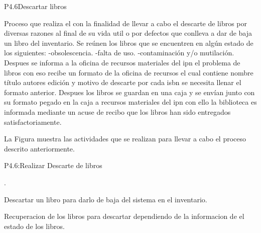 
\begin{Proceso}{P4.6}{Descartar libros } {
  

  Proceso que realiza el  con la finalidad de llevar a cabo el descarte de libros por diversas razones al final de su vida util o por defectos que conlleva a dar de baja un libro del inventario.
  Se reúnen los libros que se encuentren en algún estado de los siguientes:
  -obsolescencia.
  -falta de uso.
  -contaminación y/o mutilación.
Despues se informa a la oficina de recursos materiales del ipn el problema de libros con eso recibe un formato de la oficina de recursos el cual contiene nombre título autores edición y motivo de descarte por cada isbn se necesita llenar el formato anterior.
Despues los libros se guardan en una caja y se envían junto con su formato pegado en la caja a recursos materiales del ipn con ello la biblioteca  es informada mediante un acuse de recibo que los libros han sido entregados satisfactoriamente.




  \noindent La Figura  muestra las actividades que se realizan para llevar a cabo el proceso descrito anteriormente.


} {P4.6:Realizar Descarte de libros}


   { %
     .
  }

   { %
	Descartar un libro para darlo de baja del sistema en el inventario.
  }

   { %
  	\begin{UClist}
  		\UCli Recuperacion de los libros para descartar dependiendo de la informacion de el estado de los libros.
     	

\end{UClist}}
\end{Proceso}
